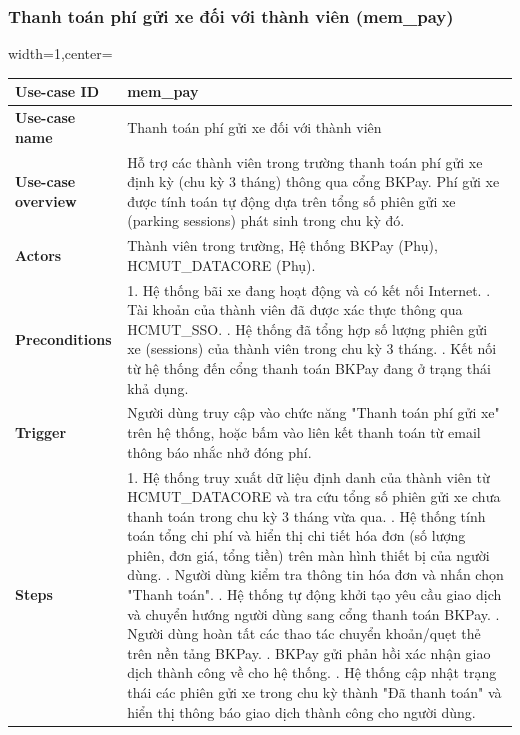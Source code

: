 \subsubsection{Thanh toán phí gửi xe đối với thành viên (mem\_pay)}
\begin{adjustbox}{width=1\textwidth,center=\textwidth}
    \small
    \begin{tabular}{|>{\centering\arraybackslash}m{3.5cm}|m{13.2cm}|} 
        \hline
        \textbf{Use-case ID} & mem\_pay \\ \hline
        \textbf{Use-case name} & Thanh toán phí gửi xe đối với thành viên \\ \hline
        \textbf{Use-case overview} & Hỗ trợ các thành viên trong trường thanh toán phí gửi xe định kỳ (chu kỳ 3 tháng) thông qua cổng BKPay. Phí gửi xe được tính toán tự động dựa trên tổng số phiên gửi xe (parking sessions) phát sinh trong chu kỳ đó. \\ \hline
        \textbf{Actors} & Thành viên trong trường, Hệ thống BKPay (Phụ), HCMUT\_DATACORE (Phụ). \\ \hline
        \textbf{Preconditions} & 
        1. Hệ thống bãi xe đang hoạt động và có kết nối Internet. \newline
        2. Tài khoản của thành viên đã được xác thực thông qua HCMUT\_SSO. \newline
        3. Hệ thống đã tổng hợp số lượng phiên gửi xe (sessions) của thành viên trong chu kỳ 3 tháng. \newline
        4. Kết nối từ hệ thống đến cổng thanh toán BKPay đang ở trạng thái khả dụng. \\ \hline
        \textbf{Trigger} & Người dùng truy cập vào chức năng "Thanh toán phí gửi xe" trên hệ thống, hoặc bấm vào liên kết thanh toán từ email thông báo nhắc nhở đóng phí. \\ \hline
        \textbf{Steps} & 
        1. Hệ thống truy xuất dữ liệu định danh của thành viên từ HCMUT\_DATACORE và tra cứu tổng số phiên gửi xe chưa thanh toán trong chu kỳ 3 tháng vừa qua. \newline
        2. Hệ thống tính toán tổng chi phí và hiển thị chi tiết hóa đơn (số lượng phiên, đơn giá, tổng tiền) trên màn hình thiết bị của người dùng. \newline
        3. Người dùng kiểm tra thông tin hóa đơn và nhấn chọn "Thanh toán". \newline
        4. Hệ thống tự động khởi tạo yêu cầu giao dịch và chuyển hướng người dùng sang cổng thanh toán BKPay. \newline
        5. Người dùng hoàn tất các thao tác chuyển khoản/quẹt thẻ trên nền tảng BKPay. \newline
        6. BKPay gửi phản hồi xác nhận giao dịch thành công về cho hệ thống. \newline
        7. Hệ thống cập nhật trạng thái các phiên gửi xe trong chu kỳ thành "Đã thanh toán" và hiển thị thông báo giao dịch thành công cho người dùng. \\ \hline
    \end{tabular}
\end{adjustbox}

